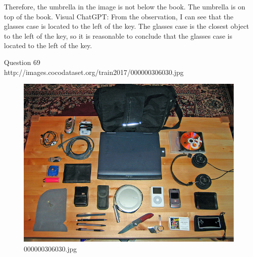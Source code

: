 \begin{enumerate}
    Therefore, the umbrella in the image is not below the book. The umbrella is on top of the book.
    \subitem Visual ChatGPT: From the observation, I can see that the glasses case is located to the left of the key. The glasses case is the closest object to the left of the key, so it is reasonable to conclude that the glasses case is located to the left of the key.
\end{enumerate}
Question 69\\
http://images.cocodataset.org/train2017/000000306030.jpg
\begin{figure}[h]
    \centering
    \includegraphics[width=0.8\linewidth]{../image set/hard/000000306030.jpg}
    \caption{000000306030.jpg}
\end{figure}
